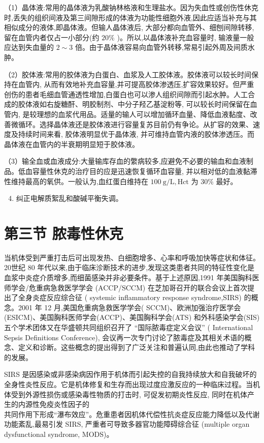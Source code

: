 \documentclass[10pt]{article}
\begin{document}
（1）晶体液:常用的晶体液为乳酸钠林格液和生理盐水。因为失血性或创伤性休克时,丢失的组织间液及第三间隙形成的体液为功能性细胞外液,因此应适当补充与其相似成分的液体,即晶体液。但输人晶体液后, 大部分都向血管外、细刨间隙转移, 留在血管内者仅占一小部分(约 $20 \%$ )。所以,以晶体液补充血容量时, 输液量一般应达到失血量的 $2 \sim 3$ 倍。由于晶体液容易向血管外转移,常易引起外周及间质水肿。

（2）胶体液:常用的胶体液为白蛋白、血浆及人工胶体液。胶体液可以较长时间保持在血管内, 从而有效地补充血容量,并可提高胶体渗透压,扩容效果较好。但严重创伤的患者毛细血管通透性增加,白蛋白也可以渗人组织间隙而引起水肿。人工合成的胶体液如右旋糖酐、明胶制剂、中分子羟乙基淀粉等, 可以较长时间保留在血管内, 是较理想的血浆代用品。适量的输人可以增加循环血量、降低血液黏度、改善微循环。选择晶体液还是胶体液进行容量复苏目前仍有争论。从扩容的效果、速度及持续时间来看, 胶体液明显优于晶体液, 并可维持血管内液的胶体渗透压。而晶体液在血管内的半衰期明显短于胶体液。

（3）输全血或血液成分:大量输库存血的䌘病较多,应避免不必要的输血和血液制品。低血容量性休克的治疗目的应是迅速恢复循环血容量, 并以相对低的血液黏滞性维持最高的氧供。一般认为,血红蛋白维持在 $100 \mathrm{~g} / \mathrm{L}, \mathrm{Hct}$ 为 $30 \%$ 最好。

\begin{enumerate}
  \setcounter{enumi}{3}
  \item 纠正电解质絮乱和酸碱平衡失调。
\end{enumerate}

\section*{第三节 脓毒性休克}
当机体受到严重打击后可出现发热、白细胞增多、心率和呼吸加快等症状和体征。20世纪 80 年代以来,由于临床沴断技术的进步,发现这类患者共同的特征性变化是血浆中炎症介质增多,而细菌感染并非必要条件。基于上述原因,1991 年美国胸科医师学会/危重病急救医学学会 (ACCP/SCCM) 在芝加哥召开的联合会议上首次提出了全身炎症反应综合征 ( systemic inflammatory response syndrome,SIRS) 的概念。2001 年 12 月,美国危重病急救医学学会( SCCM)、欧洲加强治疗医学会(ESICM)、美国胸科医师学会(ACCP)、美国胸科学会(ATS) 和外科感染学会(SIS) 五个学术团体又在华盛顿共同组织召开了 “国际脓毒症定义会议” ( International Sepsis Definitions Conference), 会议再一次专门讨论了脓毒症及其相关术语的概念、定义和诊断。这些概念的提出得到了广泛关注和普遍认同,由此也推动了学科的发展。

SIRS 是因感染或非感染病因作用于机体而引起失控的自我持续放大和自我破坏的全身性炎性反应。它是机体修复和生存而出现过度应激反应的一种临床过程。当机体受到外源性损伤或感染毒性物质的打击时, 可促发初期炎性反应, 同时在机体产生的内源性免疫炎性因子的\\
共同作用下形成“瀑布效应”。危重患者因机体代偿性抗炎症反应能力降低以及代谢功能紊乱,最易引发 SIRS, 严重者可导致多器官功能障碍综合征 (multiple organ dysfunctional syndrome, MODS)。
\end{document}

